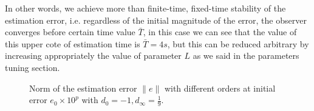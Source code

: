 \documentclass[11pt,letterpaper,twoside,openright]{report}
\providecommand{\norm}[1]{\lVert#1\rVert}
\begin{document}
In other words, we achieve more than finite-time, fixed-time stability of the estimation error, i.e. regardless of the initial magnitude of the error, the observer converges before certain time value $\bar{T}$, in this case we can see that the value of this upper cote of estimation time is $\bar{T}=4s$, but this can be reduced arbitrary by increasing appropriately the value of parameter $L$ as we said in the parameters tuning section.

\begin{figure}[htbp]
	\caption{Norm of the estimation error $\norm{e}$ with different orders at initial error $e_0\times 10^p$ with $d_0=-1,d_{\infty}=\tfrac{1}{9}$.}
	\label{fig: CH4 Error norm with orders}
\end{figure}





	
		

	
	
\end{document}
